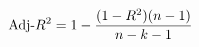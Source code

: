 \documentclass[preview]{standalone}
\begin{document}
\begin{align*}
\special{dvisvgm:raw <g id='unique000'>}\text{Adj-}R^2 = 1 - \frac{(1 - R^2)(n-1)}{n-k-1}\special{dvisvgm:raw </g>}
\end{align*}
\end{document}
